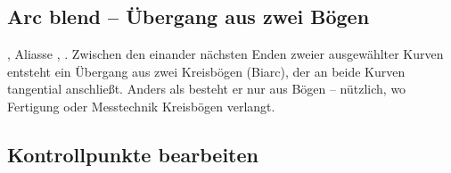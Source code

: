 \subsection{Arc blend -- Übergang aus zwei Bögen}\label{sec:cmd-arc-blend}
, Aliasse , . Zwischen den einander nächsten
Enden zweier ausgewählter Kurven entsteht ein Übergang aus zwei Kreisbögen (Biarc), der an
beide Kurven tangential anschließt. Anders als  besteht er nur aus Bögen --
nützlich, wo Fertigung oder Messtechnik Kreisbögen verlangt.

\subsection{Kontrollpunkte bearbeiten}\label{sec:kontrollpunkte}

